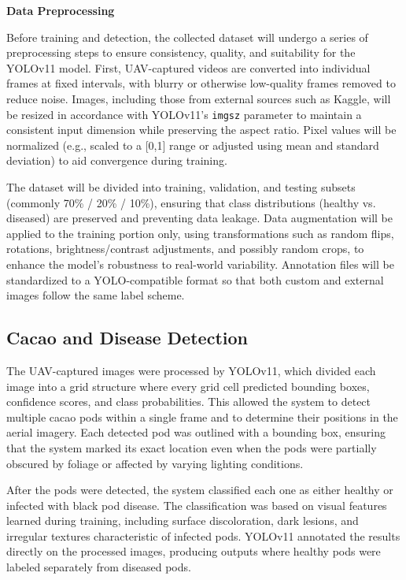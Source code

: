 \textbf{Data Preprocessing}

Before training and detection, the collected dataset will undergo a series of preprocessing steps to ensure consistency, quality, and suitability for the YOLOv11 model. First, UAV-captured videos are converted into individual frames at fixed intervals, with blurry or otherwise low-quality frames removed to reduce noise. Images, including those from external sources such as Kaggle, will be resized in accordance with YOLOv11's \texttt{imgsz} parameter to maintain a consistent input dimension while preserving the aspect ratio. Pixel values will be normalized (e.g., scaled to a [0,1] range or adjusted using mean and standard deviation) to aid convergence during training.

The dataset will be divided into training, validation, and testing subsets (commonly 70\% / 20\% / 10\%), ensuring that class distributions (healthy vs. diseased) are preserved and preventing data leakage. Data augmentation will be applied to the training portion only, using transformations such as random flips, rotations, brightness/contrast adjustments, and possibly random crops, to enhance the model’s robustness to real-world variability. Annotation files will be standardized to a YOLO-compatible format so that both custom and external images follow the same label scheme.

\subsection*{Cacao and Disease Detection}

The UAV-captured images were processed by YOLOv11, which divided each image into a grid structure where every grid cell predicted bounding boxes, confidence scores, and class probabilities. This allowed the system to detect multiple cacao pods within a single frame and to determine their positions in the aerial imagery. Each detected pod was outlined with a bounding box, ensuring that the system marked its exact location even when the pods were partially obscured by foliage or affected by varying lighting conditions.

After the pods were detected, the system classified each one as either healthy or infected with black pod disease. The classification was based on visual features learned during training, including surface discoloration, dark lesions, and irregular textures characteristic of infected pods. YOLOv11 annotated the results directly on the processed images, producing outputs where healthy pods were labeled separately from diseased pods.


